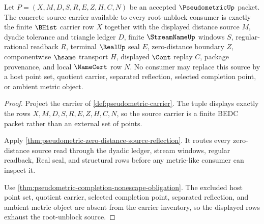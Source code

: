 \begin{theorem}
\label{thm:pseudometric-kernel-source-carrier}
Let $P=(X,M,D,S,R,E,Z,H,C,N)$ be an accepted $\PseudometricUp$ packet. The concrete source carrier available to every root-unblock consumer is exactly the finite $\BHist$ carrier row $X$ together with the displayed distance source $M$, dyadic tolerance and triangle ledger $D$, finite $\StreamNameUp$ windows $S$, regular-rational readback $R$, terminal $\RealUp$ seal $E$, zero-distance boundary $Z$, componentwise $\hsame$ transport $H$, displayed $\Cont$ replay $C$, package provenance, and local $\NameCert$ row $N$. No consumer may replace this source by a host point set, quotient carrier, separated reflection, selected completion point, or ambient metric object.
\end{theorem}
\begin{proof}
Project the carrier of \autoref{def:pseudometric-carrier}. The tuple displays exactly the rows $X,M,D,S,R,E,Z,H,C,N$, so the source carrier is a finite BEDC packet rather than an external set of points.

Apply \autoref{thm:pseudometric-zero-distance-source-reflection}. It routes every zero-distance source read through the dyadic ledger, stream windows, regular readback, Real seal, and structural rows before any metric-like consumer can inspect it.

Use \autoref{thm:pseudometric-completion-nonescape-obligation}. The excluded host point set, quotient carrier, selected completion point, separated reflection, and ambient metric object are absent from the carrier inventory, so the displayed rows exhaust the root-unblock source.
\end{proof}

